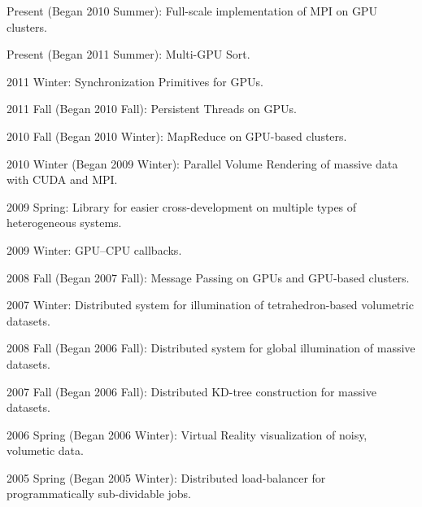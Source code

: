 Present (Began 2010 Summer): Full-scale implementation of MPI on GPU clusters.

Present (Began 2011 Summer): Multi-GPU Sort.

2011 Winter: Synchronization Primitives for GPUs.

2011 Fall (Began 2010 Fall): Persistent Threads on GPUs.

2010 Fall (Began 2010 Winter): MapReduce on GPU-based clusters.

2010 Winter (Began 2009 Winter): Parallel Volume Rendering of massive data with CUDA and MPI.

2009 Spring: Library for easier cross-development on multiple types of heterogeneous systems.

2009 Winter: GPU--CPU callbacks.

2008 Fall (Began 2007 Fall): Message Passing on GPUs and GPU-based clusters.

2007 Winter: Distributed system for illumination of tetrahedron-based volumetric datasets.

2008 Fall (Began 2006 Fall): Distributed system for global illumination of massive datasets.

2007 Fall (Began 2006 Fall): Distributed KD-tree construction for massive datasets.

2006 Spring (Began 2006 Winter): Virtual Reality visualization of noisy, volumetic data.

2005 Spring (Began 2005 Winter): Distributed load-balancer for programmatically sub-dividable jobs.

